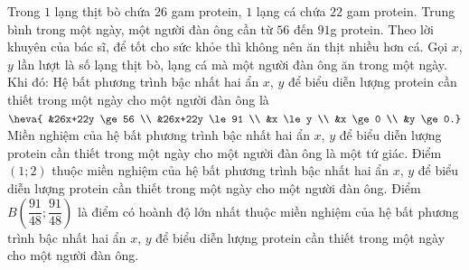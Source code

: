 \begin{ex}%
	Trong $1$ lạng thịt bò chứa $26$ gam protein, $1$ lạng cá chứa $22$ gam protein. Trung bình trong một ngày, một người đàn ông cần từ $56$ đến $91$g protein. Theo lời khuyên của bác sĩ, để tốt cho sức khỏe thì không nên ăn thịt  nhiều hơn cá. Gọi $x$, $y$ lần lượt là số lạng thịt bò, lạng cá mà một người đàn ông ăn trong một ngày. Khi đó:
	\def\dotEX{} 
	 \choiceTF
		{\True Hệ bất phương trình bậc nhất hai ẩn $x$, $y$ để biểu diễn lượng protein cần thiết  trong một ngày cho một người đàn ông là
		$\heva{ 
		&26x+22y \ge 56 \\ 
		&26x+22y \le  91 \\
		&x \le y \\ 
		&x \ge  0 \\
		&y \ge 0.}$} 
		{\True Miền nghiệm của hệ bất phương trình bậc nhất hai ẩn $x$, $y$ để biểu diễn lượng protein cần thiết  trong một ngày cho một người đàn ông là một tứ giác.}
		{\True Điểm $(1;2)$ thuộc miền nghiệm của hệ bất phương trình bậc nhất hai ẩn $x$, $y$ để biểu diễn lượng protein  cần thiết trong một ngày cho một người đàn ông.}
		{\True Điểm $B\left(\dfrac{91}{48}; \dfrac{91}{48}\right)$ là điểm có hoành độ lớn nhất thuộc miền nghiệm của hệ bất phương trình bậc nhất hai ẩn $x$, $y$ để biểu  diễn lượng protein cần thiết trong một ngày cho một người đàn ông.}
\end{ex}
